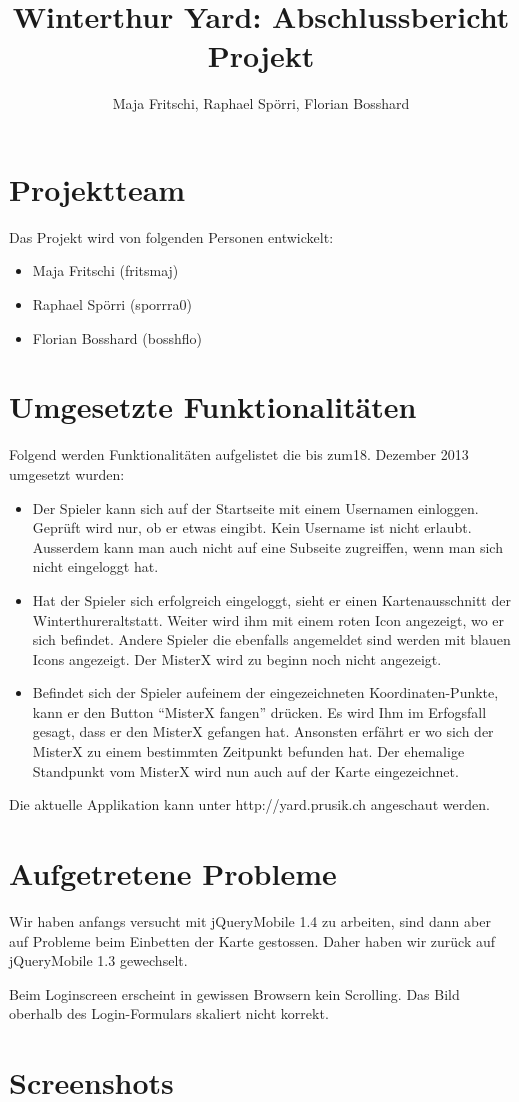 \documentclass[11pt]{article}
\title{Winterthur Yard: Abschlussbericht Projekt}
\author{Maja Fritschi, Raphael Spörri, Florian Bosshard}
\date{}
\begin{document}
\maketitle

\tableofcontents
\newpage

\section{Projektteam}
Das Projekt wird von folgenden Personen entwickelt:
\begin{itemize}
\item Maja Fritschi (fritsmaj)
\item Raphael Spörri (sporrra0)
\item Florian Bosshard (bosshflo)
\end{itemize}


\section{Umgesetzte Funktionalitäten}
Folgend werden Funktionalitäten aufgelistet die bis zum18. Dezember 2013 umgesetzt wurden: 
\begin{itemize}
\item Der Spieler kann sich auf der Startseite mit einem Usernamen einloggen. Geprüft wird nur, ob er etwas eingibt. Kein Username ist nicht erlaubt. Ausserdem kann man auch nicht auf eine Subseite zugreiffen, wenn man sich nicht eingeloggt hat.
\item Hat der Spieler sich erfolgreich eingeloggt, sieht er einen  Kartenausschnitt der Winterthureraltstatt. Weiter wird ihm mit einem roten Icon angezeigt, wo er sich befindet. Andere Spieler die ebenfalls angemeldet sind werden mit blauen Icons angezeigt. Der MisterX wird zu beginn noch nicht angezeigt.
\item Befindet sich der Spieler aufeinem der eingezeichneten Koordinaten-Punkte, kann er den Button ``MisterX fangen'' drücken. Es wird Ihm im Erfogsfall gesagt, dass er den MisterX gefangen hat.  Ansonsten erfährt er wo sich der MisterX zu einem bestimmten Zeitpunkt befunden hat. Der ehemalige Standpunkt vom MisterX wird nun auch auf der Karte eingezeichnet. 
\end{itemize}

Die aktuelle Applikation kann unter http://yard.prusik.ch angeschaut werden. 

\section{Aufgetretene Probleme}
Wir haben anfangs versucht mit jQueryMobile 1.4 zu arbeiten, sind dann aber auf Probleme beim Einbetten der Karte gestossen. Daher haben wir zurück auf jQueryMobile 1.3 gewechselt.

Beim Loginscreen erscheint in gewissen Browsern kein Scrolling. Das Bild oberhalb des Login-Formulars skaliert nicht korrekt. 



\section{Screenshots}
\end{document}
